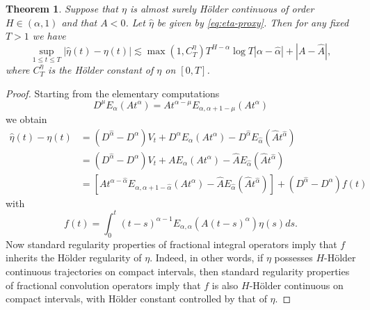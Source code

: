\documentclass[11pt,reqno,oneside, a4paper]{amsart}
\numberwithin{equation}{section}
\newtheorem{thm}{Theorem}[section]
\theoremstyle{remark}
\begin{document}
 
\begin{thm}
\label{thm:noise-error}
Suppose that $\eta$ is almost surely H\"older continuous of order $H\in(\alpha,1)$ and that $A<0$. Let $\hat\eta$ be given by \eqref{eq:eta-proxy}. Then for any fixed $T>1$ we have 
    $$
    \sup_{1\leq t\leq T}|\hat{\eta}(t) - \eta(t)| \lesssim \max(1,C^\eta_T)T^{H-\alpha}\log T |\alpha - \hat\alpha| + |A - \hat{A}|,
    $$
    where $C^\eta_T$ is the H\"older constant of $\eta$ on $[0,T]$.
\end{thm}
\begin{proof}
Starting from the elementary computations
$$
D^\mu E_{\alpha}(A t^\alpha) = At^{\alpha-\mu}E_{\alpha,\alpha+1-\mu}(A t^\alpha)
$$
we obtain
\begin{align}\label{etaapprox}
    \hat{\eta}(t) - \eta(t) &= (D^{\hat\alpha} - D^\alpha)V_t + D^{\alpha}E_\alpha(At^\alpha) - D^{\hat\alpha}E_{\hat\alpha}(\hat{A}t^{\hat\alpha}) \nonumber \\
    &= (D^{\hat\alpha} - D^\alpha)V_t + AE_\alpha(At^\alpha) - \hat{A}E_{\hat\alpha}(\hat{A}t^{\hat\alpha})\nonumber \\
    &=[At^{\alpha-\hat\alpha}E_{\alpha,\alpha+1-\hat\alpha}(A t^\alpha) - \hat{A}E_{\hat\alpha}(\hat{A}t^{\hat\alpha})]+ (D^{\hat\alpha} - D^\alpha)f(t)
\end{align}
with 
\begin{equation*}
f(t) = \int_0^t (t-s)^{\alpha-1}E_{\alpha,\alpha}(A(t-s)^\alpha)\eta(s)ds.
\end{equation*}
Now standard regularity properties of
fractional integral operators imply that $f$ inherits the H\"older regularity of $\eta$. Indeed, in other words,  if $\eta$ possesses $H$-H\"older continuous trajectories on compact intervals, then standard regularity properties of fractional convolution operators imply that $f$ is also $H$-H\"older continuous on compact intervals, with H\"older constant controlled by that of $\eta$.


\end{proof}
\end{document}
